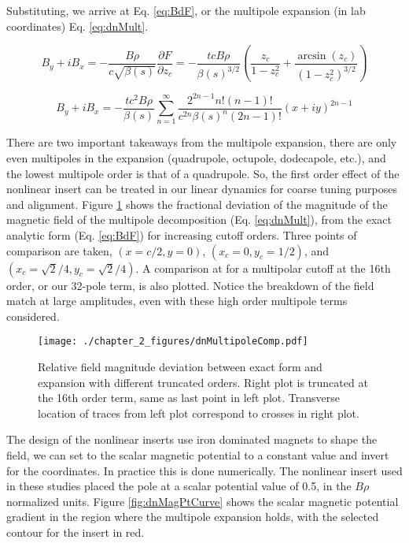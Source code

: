 Substituting, we arrive at Eq. \ref{eq:BdF}, or the multipole expansion (in lab coordinates) Eq. \ref{eq:dnMult}.

\begin{equation} \label{eq:BdF}
	B_y + i B_x  = -\frac{B\rho}{c\sqrt{\beta(s)}}\frac{\partial F}{\partial z_c} = - \frac{t c B\rho}{\beta(s)^{3/2}} \left( \frac{z_c}{1 - z_c^2} + \frac{\arcsin{(z_c)}}{\left(1-z_c^2\right)^{3/2}}\right)
\end{equation}

\begin{equation} \label{eq:dnMult}
	B_y + i B_x = - \frac{t c^2 B\rho}{\beta(s)} \sum_{n=1}^{\infty} \frac{2^{2n-1}n!(n-1)!}{c^{2n}\beta(s)^n(2n-1)!} (x + i y)^{2n -1}
\end{equation}

There are two important takeaways from the multipole expansion, there are only even multipoles in the expansion (quadrupole, octupole, dodecapole, etc.), and the lowest multipole order is that of a quadrupole. So, the first order effect of the nonlinear insert can be treated in our linear dynamics for coarse tuning purposes and alignment. Figure \ref{fig:dnMultRatio} shows the fractional deviation of the magnitude of the magnetic field of the multipole decomposition (Eq. \ref{eq:dnMult}), from the exact analytic form (Eq. \ref{eq:BdF}) for increasing cutoff orders. Three points of comparison are taken, $(x=c/2,y=0)$, $(x_c=0,y_c=1/2)$, and $(x_c=\sqrt{2}/4,y_c=\sqrt{2}/4)$. A comparison at for a multipolar cutoff at the 16th order, or our 32-pole term, is also plotted. Notice the breakdown of the field match at large amplitudes, even with these high order multipole terms considered.

\begin{figure}
	\centering
	\texttt{[image: ./chapter\_2\_figures/dnMultipoleComp.pdf]}
	\caption{Relative field magnitude deviation between exact form and expansion with different truncated orders. Right plot is truncated at the 16th order term, same as last point in left plot. Transverse location of traces from left plot correspond to crosses in right plot.}
	\label{fig:dnMultRatio}
\end{figure}

The design of the nonlinear inserts use iron dominated magnets to shape the field, we can set to the scalar magnetic potential to a constant value and invert for the coordinates. In practice this is done numerically. The nonlinear insert used in these studies placed the pole at a scalar potential value of 0.5, in the $B\rho$ normalized units. Figure \ref{fig:dnMagPtCurve} shows the scalar magnetic potential gradient in the region where the multipole expansion holds, with the selected contour for the insert in red.

